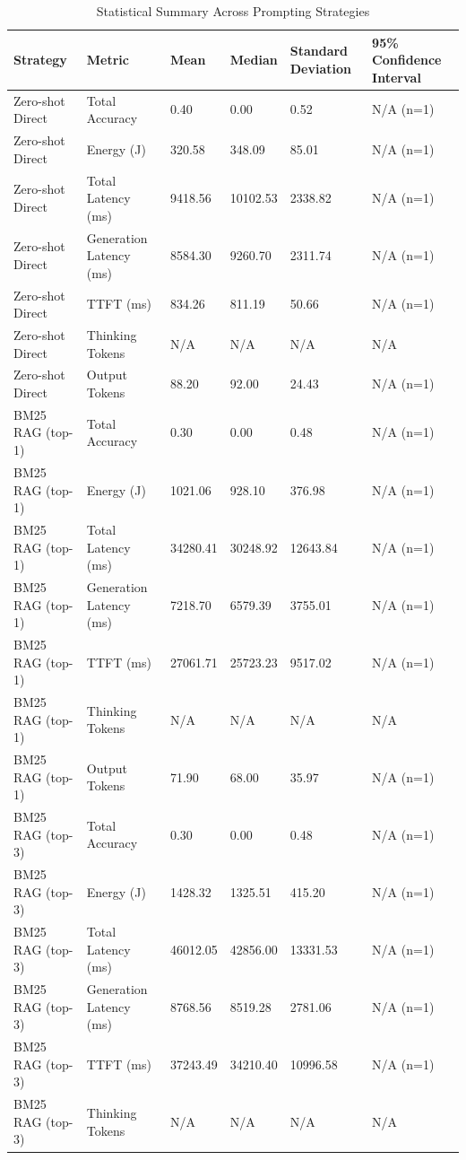 \begin{table}
\caption{Statistical Summary Across Prompting Strategies}
\label{tab:statistical_summary}
\begin{tabular}{llllll}
\toprule
Strategy & Metric & Mean & Median & Standard Deviation & 95\% Confidence Interval \\
\midrule
Zero-shot Direct & Total Accuracy & 0.40 & 0.00 & 0.52 & N/A (n=1) \\
Zero-shot Direct & Energy (J) & 320.58 & 348.09 & 85.01 & N/A (n=1) \\
Zero-shot Direct & Total Latency (ms) & 9418.56 & 10102.53 & 2338.82 & N/A (n=1) \\
Zero-shot Direct & Generation Latency (ms) & 8584.30 & 9260.70 & 2311.74 & N/A (n=1) \\
Zero-shot Direct & TTFT (ms) & 834.26 & 811.19 & 50.66 & N/A (n=1) \\
Zero-shot Direct & Thinking Tokens & N/A & N/A & N/A & N/A \\
Zero-shot Direct & Output Tokens & 88.20 & 92.00 & 24.43 & N/A (n=1) \\
BM25 RAG (top-1) & Total Accuracy & 0.30 & 0.00 & 0.48 & N/A (n=1) \\
BM25 RAG (top-1) & Energy (J) & 1021.06 & 928.10 & 376.98 & N/A (n=1) \\
BM25 RAG (top-1) & Total Latency (ms) & 34280.41 & 30248.92 & 12643.84 & N/A (n=1) \\
BM25 RAG (top-1) & Generation Latency (ms) & 7218.70 & 6579.39 & 3755.01 & N/A (n=1) \\
BM25 RAG (top-1) & TTFT (ms) & 27061.71 & 25723.23 & 9517.02 & N/A (n=1) \\
BM25 RAG (top-1) & Thinking Tokens & N/A & N/A & N/A & N/A \\
BM25 RAG (top-1) & Output Tokens & 71.90 & 68.00 & 35.97 & N/A (n=1) \\
BM25 RAG (top-3) & Total Accuracy & 0.30 & 0.00 & 0.48 & N/A (n=1) \\
BM25 RAG (top-3) & Energy (J) & 1428.32 & 1325.51 & 415.20 & N/A (n=1) \\
BM25 RAG (top-3) & Total Latency (ms) & 46012.05 & 42856.00 & 13331.53 & N/A (n=1) \\
BM25 RAG (top-3) & Generation Latency (ms) & 8768.56 & 8519.28 & 2781.06 & N/A (n=1) \\
BM25 RAG (top-3) & TTFT (ms) & 37243.49 & 34210.40 & 10996.58 & N/A (n=1) \\
BM25 RAG (top-3) & Thinking Tokens & N/A & N/A & N/A & N/A \\

\end{tabular}
\end{table}
